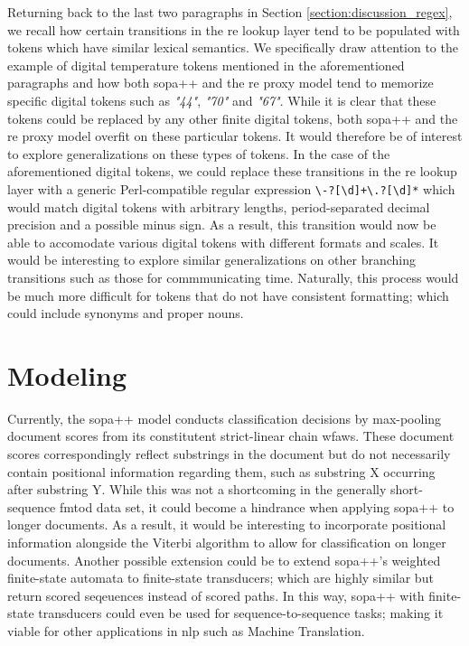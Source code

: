 Returning back to the last two paragraphs in Section
\ref{section:discussion_regex}, we recall how certain transitions in the \ac{re}
lookup layer tend to be populated with tokens which have similar lexical
semantics. We specifically draw attention to the example of digital temperature
tokens mentioned in the aforementioned paragraphs and how both \ac{sopa}++ and the \ac{re}
proxy model tend to memorize specific digital tokens such as \textit{"44"},
\textit{"70"} and \textit{"67"}. While it is clear that these tokens could be
replaced by any other finite digital tokens, both \ac{sopa}++ and the \ac{re} proxy model
overfit on these particular tokens. It would therefore be of interest to explore
generalizations on these types of tokens. In the case of the aforementioned
digital tokens, we could replace these transitions in the \ac{re} lookup layer with a
generic Perl-compatible regular expression
\texttt{\textbackslash-?[\textbackslash d]+\textbackslash .?[\textbackslash d]*}
which would match digital tokens with arbitrary lengths, period-separated
decimal precision and a possible minus sign. As a result, this transition would
now be able to accomodate various digital tokens with different formats and
scales. It would be interesting to explore similar generalizations on other
branching transitions such as those for commmunicating time. Naturally, this
process would be much more difficult for tokens that do not have consistent
formatting; which could include synonyms and proper nouns.

\section{Modeling}

Currently, the \ac{sopa}++ model conducts classification decisions by max-pooling
document scores from its constitutent strict-linear chain \ac{wfaws}. These
document scores correspondingly reflect substrings in the document but do not
necessarily contain positional information regarding them, such as substring
X occurring after substring Y. While this was not a shortcoming in the generally
short-sequence \ac{fmtod} data set, it could become a hindrance when applying \ac{sopa}++
to longer documents. As a result, it would be interesting to incorporate
positional information alongside the Viterbi algorithm to allow for
classification on longer documents. Another possible extension could be to
extend \ac{sopa}++'s weighted finite-state automata to finite-state transducers;
which are highly similar but return scored seqeuences instead of scored paths.
In this way, \ac{sopa}++ with finite-state transducers could even be used for
sequence-to-sequence tasks; making it viable for other applications in \ac{nlp} such
as Machine Translation.

